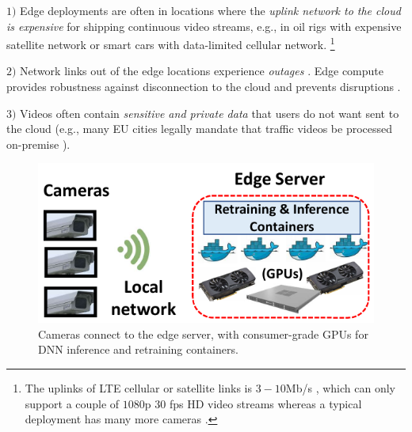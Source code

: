 $1)$ Edge deployments are often in locations where the {\em uplink network to the cloud is expensive} for shipping continuous video streams, %
e.g., in oil rigs with expensive satellite network or smart cars with data-limited cellular network. %
\footnote{The uplinks of LTE cellular or satellite links is $3-10$Mb/s \cite{39-getmobile, 57-getmobile}, which can only support a couple of $1080$p 30 fps HD video streams whereas a typical deployment has many more cameras \cite{getmobile}.}

$2)$ Network links out of the edge locations experience {\em outages} \cite{20-getmobile, getmobile}. %
Edge compute provides robustness against disconnection to the cloud \cite{chick-fill} and prevents disruptions \cite{37-getmobile}. 

$3)$ Videos often contain {\em sensitive and private data} that users do not want sent to the cloud (e.g., many EU cities legally mandate that traffic videos be processed on-premise \cite{sweden-data, azure-data}). %

 \begin{figure}[t!]
     \centering
     \includegraphics[width=0.6\columnwidth]{ekya/figures/xxx_cropped.pdf}
     \caption{Cameras connect to the edge server, with consumer-grade GPUs for DNN inference and retraining containers.%
     }
     \label{fig:edge}
 \end{figure}

